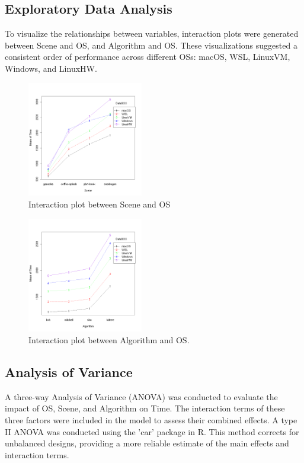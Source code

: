 \documentclass[conference]{IEEEtran}
\begin{document}
\subsection{Exploratory Data Analysis}

To visualize the relationships between variables, interaction plots were generated between Scene and OS, and Algorithm and OS. These visualizations suggested a consistent order of performance across different OSs: macOS, WSL, LinuxVM, Windows, and LinuxHW.

\begin{figure}[H]
    \label{int-scene-os}
    \centering
    \includegraphics[width=0.45\textwidth]{images/image1.png}
    \caption{Interaction plot between Scene and OS}
\end{figure}

\begin{figure}[H]
    \label{int-scene-algo}
    \centering
    \includegraphics[width=0.45\textwidth]{images/image2.png}
    \caption{Interaction plot between Algorithm and OS.}
\end{figure}


\subsection{Analysis of Variance}

A three-way Analysis of Variance (ANOVA) was conducted to evaluate the impact of OS, Scene, and Algorithm on Time. The interaction terms of these three factors were included in the model to assess their combined effects. A type II ANOVA was conducted using the 'car' package in R. This method corrects for unbalanced designs, providing a more reliable estimate of the main effects and interaction terms.
\end{document}
